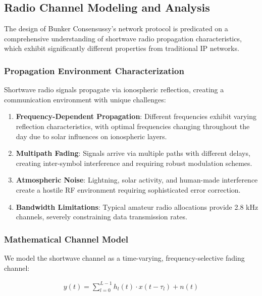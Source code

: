\documentclass[11pt,a4paper]{article}
\begin{document}
\subsection{Radio Channel Modeling and Analysis}

The design of Bunker Consensussy's network protocol is predicated on a comprehensive understanding of shortwave radio propagation characteristics, which exhibit significantly different properties from traditional IP networks.

\subsubsection{Propagation Environment Characterization}

Shortwave radio signals propagate via ionospheric reflection, creating a communication environment with unique challenges:

\begin{enumerate}
\item \textbf{Frequency-Dependent Propagation}: Different frequencies exhibit varying reflection characteristics, with optimal frequencies changing throughout the day due to solar influences on ionospheric layers.

\item \textbf{Multipath Fading}: Signals arrive via multiple paths with different delays, creating inter-symbol interference and requiring robust modulation schemes.

\item \textbf{Atmospheric Noise}: Lightning, solar activity, and human-made interference create a hostile RF environment requiring sophisticated error correction.

\item \textbf{Bandwidth Limitations}: Typical amateur radio allocations provide 2.8 kHz channels, severely constraining data transmission rates.
\end{enumerate}

\subsubsection{Mathematical Channel Model}

We model the shortwave channel as a time-varying, frequency-selective fading channel:

\begin{align}
y(t) = \sum_{l=0}^{L-1} h_l(t) \cdot x(t - \tau_l) + n(t)
\end{align}
\end{document}
